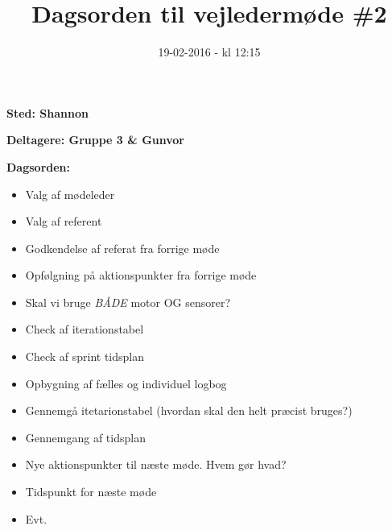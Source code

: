 \documentclass{article}
\title{Dagsorden til vejledermøde \#2}
\date{19-02-2016 - kl 12:15}
\begin{document}
	\maketitle

	\textbf{Sted: Shannon}
	
	\textbf{Deltagere: Gruppe 3 \& Gunvor}
	
	\textbf{Dagsorden:}
	\begin{itemize}
		\item Valg af mødeleder
		\item Valg af referent
		\item Godkendelse af referat fra forrige møde 
		\item Opfølgning på aktionspunkter fra forrige møde
		\item Skal vi bruge \textit{BÅDE} motor OG sensorer?
		\item Check af iterationstabel
		\item Check af sprint tidsplan
		\item Opbygning af fælles og individuel logbog
		\item Gennemgå itetarionstabel (hvordan skal den helt præcist bruges?)
		\item Gennemgang af tidsplan 
		\item Nye aktionspunkter til næste møde. Hvem gør hvad? 
		\item Tidspunkt for næste møde 
		\item Evt. 
	\end{itemize}
\end{document}
